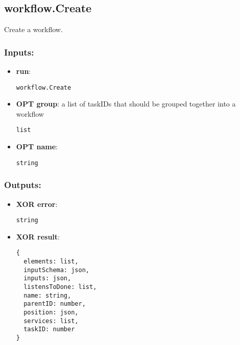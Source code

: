 \subsection{workflow.Create}
\label{ch:builtinservices:workflow.Create}
Create a workflow.
\subsubsection*{Inputs:}
\begin{itemize}
    \item \textbf{run}: 
\begin{lstlisting}
workflow.Create
\end{lstlisting}
    \item \textbf{OPT group}: a list of taskIDs that should be grouped together into a workflow
\begin{lstlisting}
list
\end{lstlisting}
    \item \textbf{OPT name}: 
\begin{lstlisting}
string
\end{lstlisting}
  \end{itemize}

\subsubsection*{Outputs:}
\begin{itemize}
    \item \textbf{XOR error}: 
\begin{lstlisting}
string
\end{lstlisting}
    \item \textbf{XOR result}: 
\begin{lstlisting}
{
  elements: list, 
  inputSchema: json, 
  inputs: json, 
  listensToDone: list, 
  name: string, 
  parentID: number, 
  position: json, 
  services: list, 
  taskID: number
}
\end{lstlisting}
  \end{itemize}


